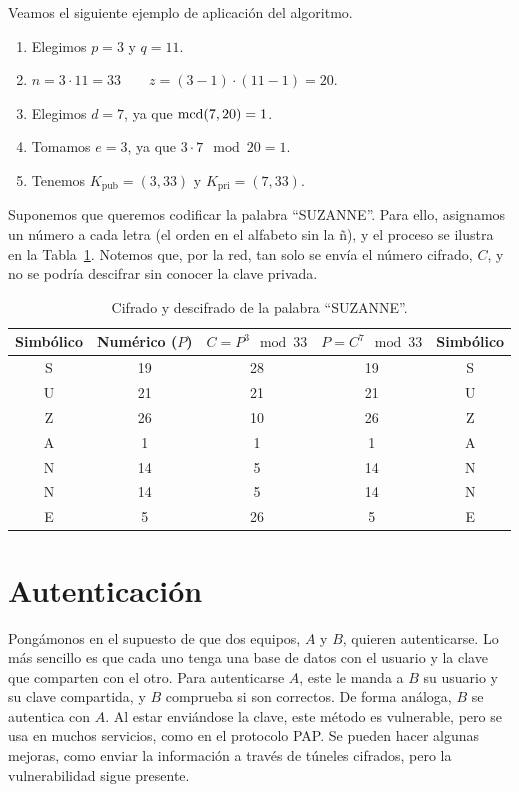\begin{ejemplo}
    Veamos el siguiente ejemplo de aplicación del algoritmo.
    \begin{enumerate}
        \item Elegimos $p=3$ y $q=11$.
        \item $n = 3\cdot 11 = 33\qquad z = (3-1)\cdot(11-1) = 20$.
        \item Elegimos $d=7$, ya que $\operatorname{mcd}(7,20)=1$.
        \item Tomamos $e=3$, ya que $3\cdot 7 \mod 20 = 1$.
        \item Tenemos $K_{\text{pub}} = (3,33)$ y $K_{\text{pri}} = (7,33)$.
    \end{enumerate}

    Suponemos que queremos codificar la palabra ``SUZANNE''. Para ello, asignamos un número a cada letra (el orden en el alfabeto sin la ñ), y el proceso se ilustra en la Tabla~\ref{tab:rsa}. Notemos que, por la red, tan solo se envía el número cifrado, $C$, y no se podría descifrar sin conocer la clave privada.
    \begin{table}[H]
        \centering
        \begin{tabular}{cc||c||c||c}
            Simbólico & Numérico ($P$) & $C=P^3\mod 33$ & $P=C^7\mod 33$ & Simbólico\\
            \hline
            S & 19 & 28 & 19 & S\\
            U & 21 & 21 & 21 & U\\
            Z & 26 & 10 & 26 & Z\\
            A & 1 & 1 & 1 & A\\
            N & 14 & 5 & 14 & N\\
            N & 14 & 5 & 14 & N\\
            E & 5 & 26 & 5 & E
        \end{tabular}
        \caption{Cifrado y descifrado de la palabra ``SUZANNE''.}
        \label{tab:rsa}
    \end{table}
\end{ejemplo}

\section{Autenticación}
Pongámonos en el supuesto de que dos equipos, $A$ y $B$, quieren autenticarse. Lo más sencillo es que cada uno tenga una base de datos con el usuario y la clave que comparten con el otro. Para autenticarse $A$, este le manda a $B$ su usuario y su clave compartida, y $B$ comprueba si son correctos. De forma análoga, $B$ se autentica con $A$. Al estar enviándose la clave, este método es vulnerable, pero se usa en muchos servicios, como en el protocolo \acrshort{PAP}. Se pueden hacer algunas mejoras, como enviar la información a través de túneles cifrados, pero la vulnerabilidad sigue presente.\\

